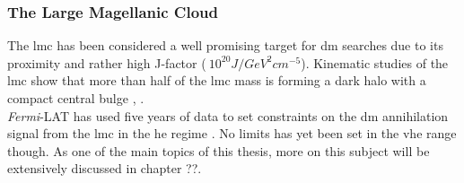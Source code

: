 \documentclass[main.tex]{subfiles}
\begin{document}
\subsubsection{The Large Magellanic Cloud}

The \gls{lmc} has been considered a well promising target for \gls{dm} searches due to its proximity and rather high J-factor ($~10^{20} J/GeV^{2}cm^{-5}$). Kinematic studies of the \gls{lmc} show that more than half of the \gls{lmc} mass is forming a dark halo with a compact central bulge \cite{2006LMCkinematics}, \cite{1999LMCcentralbulge}.\\
\textit{Fermi}-LAT has used five years of data to set constraints on the \gls{dm} annihilation signal from the \gls{lmc} in the \gls{he} regime \cite{2015LMCDarkMatterFermi}. No limits has yet been set in the \gls{vhe} range though. 
As one of the main topics of this thesis, more on this subject will be extensively discussed in chapter ??.
\end{document}
